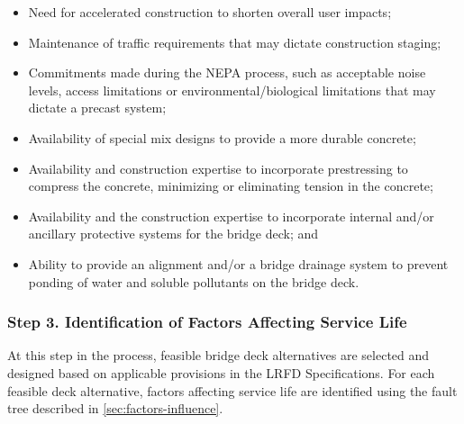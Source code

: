 \begin{itemize}
  \item Need for accelerated construction to shorten overall user impacts;
  \item Maintenance of traffic requirements that may dictate construction staging;
  \item Commitments made during the NEPA process, such as acceptable noise levels, access limitations or environmental/biological limitations that may dictate a precast system;
  \item Availability of special mix designs to provide a more durable concrete;
  \item Availability and construction expertise to incorporate prestressing to compress the concrete, minimizing or eliminating tension in the concrete;
  \item Availability and the construction expertise to incorporate internal and/or ancillary protective systems for the bridge deck; and
  \item Ability to provide an alignment and/or a bridge drainage system to prevent ponding of water and soluble pollutants on the bridge deck.
\end{itemize}

\subsubsection*{Step 3. Identification of Factors Affecting Service Life}
At this step in the process, feasible bridge deck alternatives are selected and designed based on applicable provisions in the LRFD Specifications. For each feasible deck alternative, factors affecting service life are identified using the fault tree described in \cref{sec:factors-influence}.

